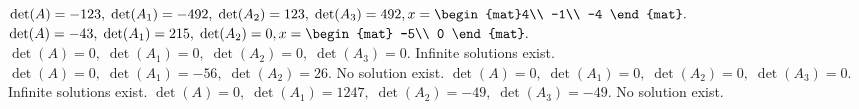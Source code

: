 \begin{Answer}
\Question $\det(A)=-123 ,\; \det(A_1)=-492 ,\; \det(A_2)= 123,\; \det(A_3)= 492,\\ x=\begin{mat}4\\  -1\\  -4 \end{mat}.$
\Question $\det(A)=-43 ,\; \det(A_1)=215 ,\; \det(A_2)= 0,\\ x=\begin{mat} -5\\  0 \end{mat}.$
\Question $\det(A)=0 ,\; \det(A_1)=0 ,\; \det(A_2)=0 ,\; \det(A_3)=0 .$ Infinite solutions exist.
\Question $\det(A)=0 ,\; \det(A_1)= -56,\; \det(A_2)= 26.$ No solution exist.
\Question $\det(A)=0 ,\; \det(A_1)=0 ,\; \det(A_2)=0 ,\; \det(A_3)=0 .$ Infinite solutions exist.
\Question $\det(A)=0 ,\; \det(A_1)=1247 ,\; \det(A_2)=-49 ,\; \det(A_3)=-49.$ No solution exist.
\end{Answer}
